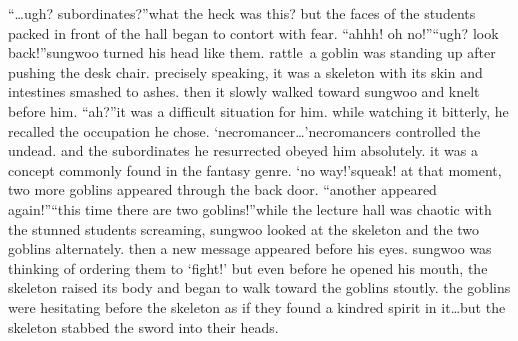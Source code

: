 “…ugh? subordinates?”what the heck was this? but the faces of the students packed in front of the hall began to contort with fear.
“ahhh! oh no!”“ugh? look back!”sungwoo turned his head like them.
rattle~a goblin was standing up after pushing the desk chair.
 precisely speaking, it was a skeleton with its skin and intestines smashed to ashes.
then it slowly walked toward sungwoo and knelt before him.
“ah?”it was a difficult situation for him.
 while watching it bitterly, he recalled the occupation he chose.
‘necromancer…’necromancers controlled the undead.
 and the subordinates he resurrected obeyed him absolutely.
 it was a concept commonly found in the fantasy genre.
‘no way!’squeak! at that moment, two more goblins appeared through the back door.
“another appeared again!”“this time there are two goblins!”while the lecture hall was chaotic with the stunned students screaming, sungwoo looked at the skeleton and the two goblins alternately.
 then a new message appeared before his eyes.
sungwoo was thinking of ordering them to ‘fight!’ but even before he opened his mouth, the skeleton raised its body and began to walk toward the goblins stoutly.
the goblins were hesitating before the skeleton as if they found a kindred spirit in it…but the skeleton stabbed the sword into their heads.


 